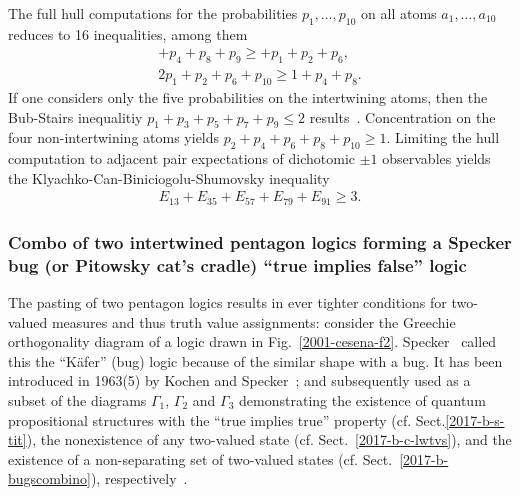 \documentclass[%
  twocolumn,
 showpacs,
 showkeys,
 preprintnumbers,
 amsmath,amssymb,
 aps,
  pra,
  longbibliography,
 floatfix,
 ]{revtex4-1}
\begin{document}
The full hull computations for the probabilities $p_1, \ldots , p_{10}$
on all atoms $a_1, \ldots , a_{10}$
reduces to 16 inequalities, among them
\begin{equation}
\begin{split}
      + p_4              + p_8  + p_9               \ge          + p_1 + p_2    +p_6,       \\
   2p_1 + p_2             + p_6                + p_{10}     \ge           1  + p_4   + p_8.
\label{2017-b-completepp}
\end{split}
\end{equation}
If one considers only the five probabilities on the intertwining atoms,
then the Bub-Stairs inequalitiy
$p_1+p_3+p_5+p_7+p_9 \le 2$
results~\cite{Bub-2009,Bub-2010,Badziag-2011}.
Concentration on the four non-intertwining atoms yields $p_2+p_4+p_6+p_8+p_{10} \ge 1$.
Limiting the hull computation to adjacent pair expectations of dichotomic $\pm 1$ observables
yields the Klyachko-Can-Biniciogolu-Shumovsky inequality~\cite{Klyachko-2008}
\begin{equation}
\begin{split}
E_{13}  + E_{35}  + E_{57}  + E_{79}  + E_{91}   \ge 3
.
\end{split}
\label{2017-b-klyacbs}
\end{equation}



%



\subsubsection{Combo of two intertwined pentagon logics forming a Specker bug (or Pitowsky cat's cradle) ``true implies false'' logic}
\label{2017-b-s-tif}
\label{2017-b-speckerbug}


The pasting of two pentagon logics results in ever tighter conditions for two-valued measures and thus truth value assignments:
consider the Greechie orthogonality diagram of a logic drawn in Fig.~\ref{2001-cesena-f2}.
Specker~\cite{Specker-priv} called this the ``K\"afer'' (bug) logic  because of the similar shape with a bug.
It has been introduced in 1963(5) by Kochen and Specker~\cite[Fig.~1, p.~182]{kochen2};
and subsequently used as a subset of the diagrams $\Gamma_1$, $\Gamma_2$ and $\Gamma_3$ demonstrating
the existence of quantum propositional structures with the ``true implies true'' property (cf. Sect.\ref{2017-b-s-tit}),
the nonexistence of any two-valued state (cf. Sect.~\ref{2017-b-c-lwtvs}),
and the existence of a non-separating set of two-valued states (cf. Sect.~\ref{2017-b-bugscombino}), respectively~\cite{kochen1}.
\end{document}
